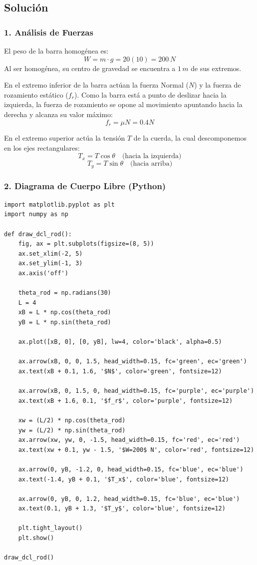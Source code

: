 \documentclass[12pt, a4paper]{article}
\begin{document}
\subsection*{Solución}

\subsubsection*{1. Análisis de Fuerzas}
El peso de la barra homogénea es:
$$W = m \cdot g = 20(10) = 200 \, \si{N}$$
Al ser homogénea, su centro de gravedad se encuentra a $1 \, \si{m}$ de sus extremos.

En el extremo inferior de la barra actúan la fuerza Normal ($N$) y la fuerza de rozamiento estático ($f_r$). Como la barra está a punto de deslizar hacia la izquierda, la fuerza de rozamiento se opone al movimiento apuntando hacia la derecha y alcanza su valor máximo:
$$f_r = \mu N = 0.4 N$$

En el extremo superior actúa la tensión $T$ de la cuerda, la cual descomponemos en los ejes rectangulares:
$$T_x = T \cos\theta \quad \text{(hacia la izquierda)}$$
$$T_y = T \sin\theta \quad \text{(hacia arriba)}$$

\subsubsection*{2. Diagrama de Cuerpo Libre (Python)}

\begin{lstlisting}
import matplotlib.pyplot as plt
import numpy as np

def draw_dcl_rod():
    fig, ax = plt.subplots(figsize=(8, 5))
    ax.set_xlim(-2, 5)
    ax.set_ylim(-1, 3)
    ax.axis('off')
    
    theta_rod = np.radians(30)
    L = 4
    xB = L * np.cos(theta_rod)
    yB = L * np.sin(theta_rod)
    
    ax.plot([xB, 0], [0, yB], lw=4, color='black', alpha=0.5)
    
    ax.arrow(xB, 0, 0, 1.5, head_width=0.15, fc='green', ec='green')
    ax.text(xB + 0.1, 1.6, '$N$', color='green', fontsize=12)
    
    ax.arrow(xB, 0, 1.5, 0, head_width=0.15, fc='purple', ec='purple')
    ax.text(xB + 1.6, 0.1, '$f_r$', color='purple', fontsize=12)
    
    xw = (L/2) * np.cos(theta_rod)
    yw = (L/2) * np.sin(theta_rod)
    ax.arrow(xw, yw, 0, -1.5, head_width=0.15, fc='red', ec='red')
    ax.text(xw + 0.1, yw - 1.5, '$W=200$ N', color='red', fontsize=12)
    
    ax.arrow(0, yB, -1.2, 0, head_width=0.15, fc='blue', ec='blue')
    ax.text(-1.4, yB + 0.1, '$T_x$', color='blue', fontsize=12)
    
    ax.arrow(0, yB, 0, 1.2, head_width=0.15, fc='blue', ec='blue')
    ax.text(0.1, yB + 1.3, '$T_y$', color='blue', fontsize=12)
    
    plt.tight_layout()
    plt.show()

draw_dcl_rod()
\end{lstlisting}
\end{document}
